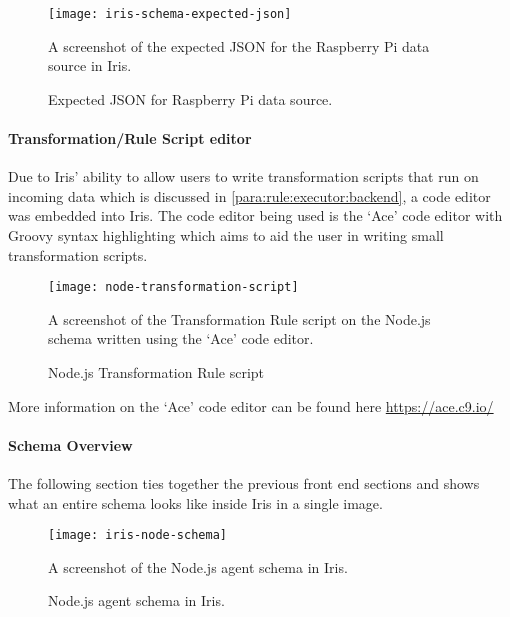 \documentclass[12pt,a4paper,titlepage]{report}
\begin{document}
\begin{figure}[H]
\begin{tcolorbox}
\begin{center}
\texttt{[image: iris-schema-expected-json]}
\end{center}
A screenshot of the expected JSON for the Raspberry Pi data source in Iris.
\end{tcolorbox}
\caption{Expected JSON for Raspberry Pi data source.}
\end{figure}

\paragraph{Transformation/Rule Script editor}
Due to Iris' ability to allow users to write transformation scripts that run on incoming data which is discussed in \cref{para:rule:executor:backend}, a code editor was embedded into Iris. The code editor being used is the `Ace' code editor with Groovy syntax highlighting which aims to aid the user in writing small transformation scripts.

\begin{figure}[H]
\begin{tcolorbox}
\begin{center}
\texttt{[image: node-transformation-script]}
\end{center}
A screenshot of the Transformation Rule script on the Node.js schema written using the `Ace' code editor.
\end{tcolorbox}
\caption{Node.js Transformation Rule script}
\label{fig:rule:executor}
\end{figure}

More information on the `Ace' code editor can be found here \url{https://ace.c9.io/}

\paragraph{Schema Overview}
The following section ties together the previous front end sections and shows what an entire schema looks like inside Iris in a single image.

\begin{figure}[H]
\begin{tcolorbox}
\begin{center}
\texttt{[image: iris-node-schema]}
\end{center}
A screenshot of the Node.js agent schema in Iris.
\end{tcolorbox}
\caption{Node.js agent schema in Iris.}
\end{figure}
\end{document}
